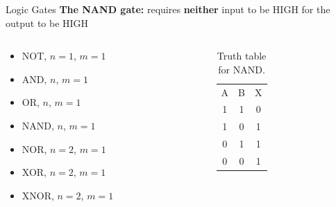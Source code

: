 \documentclass{beamer}
\begin{document}
\begin{frame}{Logic Gates}
\textbf{The NAND gate:} requires \textbf{neither} input to be HIGH for the output to be HIGH \\ \vspace{0.5cm}
\begin{columns}[T]
\begin{column}{0.5\textwidth}
\begin{itemize}
\item \alert{NOT, $n=1$, $m=1$}
\item \alert{AND, $n$, $m=1$}
\item \alert{OR, $n$, $m=1$}
\item \alert{NAND, $n$, $m=1$}
\item NOR, $n=2$, $m=1$
\item XOR, $n=2$, $m=1$
\item XNOR, $n=2$, $m=1$
\end{itemize}
\end{column}
\begin{column}{0.5\textwidth}
\begin{table}
\begin{tabular}{c c c}
A & B & X \\
1 & 1 & 0 \\
1 & 0 & 1 \\
0 & 1 & 1 \\
0 & 0 & 1
\end{tabular}
\caption{\label{tab:NAND} Truth table for NAND.}
\end{table}
\end{column}
\end{columns}
\end{frame}
\end{document}
